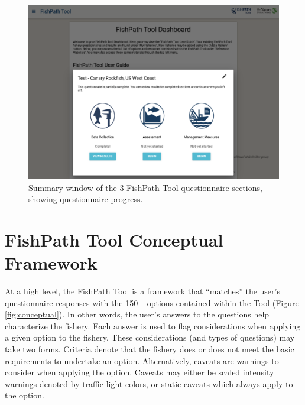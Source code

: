 \documentclass[
  11pt,
]{book}
\begin{document}
\begin{figure}
 
 {\centering \includegraphics[width=0.95\linewidth]{images/summary-screen} 
 
 }
 
 \caption{Summary window of the 3 FishPath Tool questionnaire sections, showing questionnaire progress.}\label{fig:summary-screen}
 \end{figure}

\hypertarget{fishpath-tool-conceptual-framework}{%
\section{FishPath Tool Conceptual Framework}\label{fishpath-tool-conceptual-framework}}

At a high level, the FishPath Tool is a framework that ``matches'' the user's questionnaire responses with the 150+ options contained within the Tool (Figure \ref{fig:conceptual}). In other words, the user's answers to the questions help characterize the fishery. Each answer is used to flag considerations when applying a given option to the fishery. These considerations (and types of questions) may take two forms. Criteria denote that the fishery does or does not meet the basic requirements to undertake an option. Alternatively, caveats are warnings to consider when applying the option. Caveats may either be scaled intensity warnings denoted by traffic light colors, or static caveats which always apply to the option.
\end{document}

